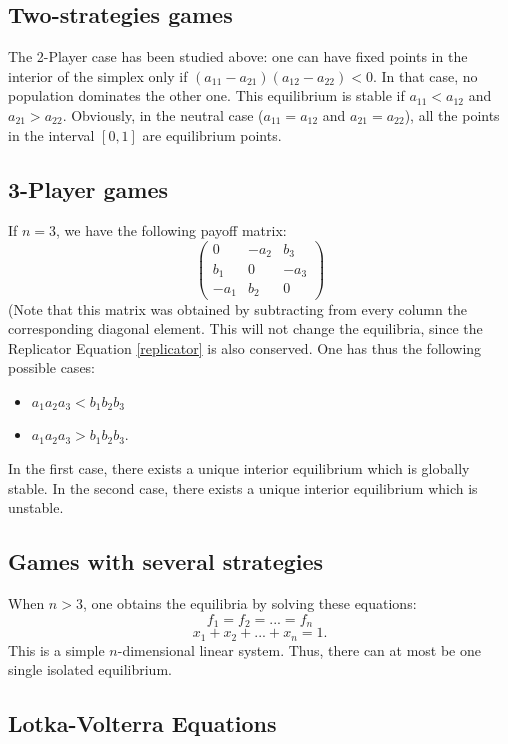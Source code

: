 \subsection{Two-strategies games}
The 2-Player case has been studied above: one can have fixed points in the interior of the simplex only if $(a_{11}-a_{21})(a_{12}-a_{22})<0.$ In that case, no population dominates the other one. This equilibrium is stable if $a_{11}<a_{12}$ and $a_{21}>a_{22}$. Obviously, in the neutral case ($a_{11}=a_{12}$ and $a_{21}=a_{22}$), all the points in the interval $[0,1]$ are equilibrium points.

\subsection{3-Player games}
If $n=3$, we have the following payoff matrix:
\[
\begin{pmatrix}
	0 & -a_{2} & b_{3} \\
	b_{1} & 0 & -a_{3} \\
	-a_{1} & b_2 & 0 
\end{pmatrix}
\]
(Note that this matrix was obtained by subtracting from every column the corresponding diagonal element.  This will not change the equilibria, since the Replicator Equation \eqref{replicator} is also conserved.  One has thus the following possible cases:
\begin{itemize}
\item $a_1a_2a_3<b_1b_2b_3$
\item $a_1a_2a_3>b_1b_2b_3.$
\end{itemize}
In the first case, there exists a unique interior equilibrium which is globally stable.  In the second case, there exists a unique interior equilibrium which is unstable.
\subsection{Games with several strategies}
When $n>3$, one obtains the equilibria by solving these equations:
\[f_1 = f_2 = ... = f_n\]
\[x_1+x_2+...+x_n = 1.\]
This is a simple $n$-dimensional linear system.  Thus, there can at most be one single isolated equilibrium.
\subsection{Lotka-Volterra Equations}

